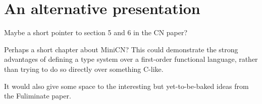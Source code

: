 \chapter{An alternative presentation}\label{chap:kernel-alternative}

Maybe a short pointer to section 5 and 6 in the CN paper?

Perhaps a short chapter about MiniCN\@? This could demonstrate the strong
advantages of defining a type system over a first-order functional language,
rather than trying to do so directly over something C-like.

It would also give some space to the interesting but yet-to-be-baked ideas
from the Fuliminate paper.


